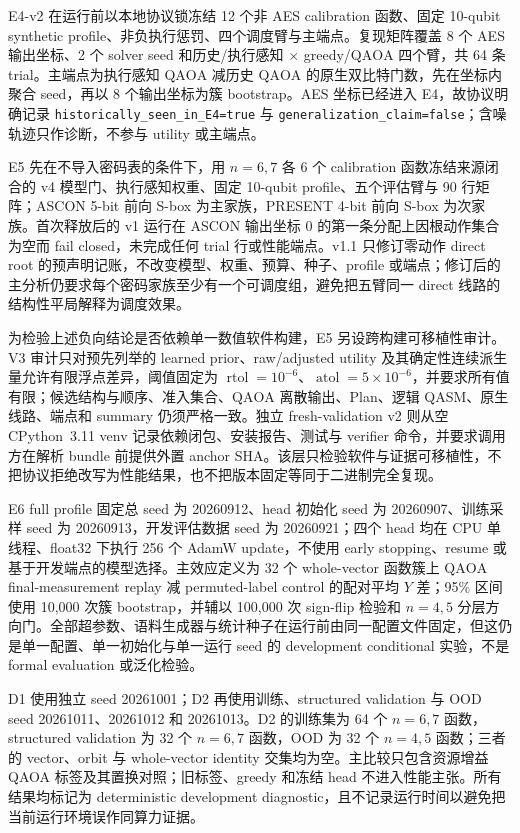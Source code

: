 \documentclass[UTF8,fontset=fandol,11pt]{ctexart}
\newcommand{\qaoa}{\ensuremath{\mathrm{QAOA}}}
\begin{document}
E4-v2 在运行前以本地协议锁冻结 12 个非 AES calibration 函数、固定 10-qubit synthetic profile、非负执行惩罚、四个调度臂与主端点。复现矩阵覆盖 8 个 AES 输出坐标、2 个 solver seed 和历史/执行感知 $\times$ greedy/\qaoa{} 四个臂，共 64 条 trial。主端点为执行感知 \qaoa{} 减历史 \qaoa{} 的原生双比特门数，先在坐标内聚合 seed，再以 8 个输出坐标为簇 bootstrap。AES 坐标已经进入 E4，故协议明确记录 \texttt{historically\_seen\_in\_E4=true} 与 \texttt{generalization\_claim=false}；含噪轨迹只作诊断，不参与 utility 或主端点。

E5 先在不导入密码表的条件下，用 $n=6,7$ 各 6 个 calibration 函数冻结来源闭合的 v4 模型门、执行感知权重、固定 10-qubit profile、五个评估臂与 90 行矩阵；ASCON 5-bit 前向 S-box 为主家族，PRESENT 4-bit 前向 S-box 为次家族\cite{nist2025ascon,bogdanov2007present}。首次释放后的 v1 运行在 ASCON 输出坐标 0 的第一条分配上因根动作集合为空而 fail closed，未完成任何 trial 行或性能端点。v1.1 只修订零动作 direct root 的预声明记账，不改变模型、权重、预算、种子、profile 或端点；修订后的主分析仍要求每个密码家族至少有一个可调度组，避免把五臂同一 direct 线路的结构性平局解释为调度效果。

为检验上述负向结论是否依赖单一数值软件构建，E5 另设跨构建可移植性审计。V3 审计只对预先列举的 learned prior、raw/adjusted utility 及其确定性连续派生量允许有限浮点差异，阈值固定为 $\operatorname{rtol}=10^{-6}$、$\operatorname{atol}=5\times10^{-6}$，并要求所有值有限；候选结构与顺序、准入集合、\qaoa{} 离散输出、Plan、逻辑 QASM、原生线路、端点和 summary 仍须严格一致。独立 fresh-validation v2 则从空 CPython~3.11 venv 记录依赖闭包、安装报告、测试与 verifier 命令，并要求调用方在解析 bundle 前提供外置 anchor SHA。该层只检验软件与证据可移植性，不把协议拒绝改写为性能结果，也不把版本固定等同于二进制完全复现。

E6 full profile 固定总 seed 为 20260912、head 初始化 seed 为 20260907、训练采样 seed 为 20260913，开发评估数据 seed 为 20260921；四个 head 均在 CPU 单线程、float32 下执行 256 个 AdamW update，不使用 early stopping、resume 或基于开发端点的模型选择。主效应定义为 32 个 whole-vector 函数簇上 \qaoa{} final-measurement replay 减 permuted-label control 的配对平均 $Y$ 差；95\% 区间使用 10,000 次簇 bootstrap，并辅以 100,000 次 sign-flip 检验和 $n=4,5$ 分层方向门。全部超参数、语料生成器与统计种子在运行前由同一配置文件固定，但这仍是单一配置、单一初始化与单一运行 seed 的 development conditional 实验，不是 formal evaluation 或泛化检验。

D1 使用独立 seed 20261001；D2 再使用训练、structured validation 与 OOD seed 20261011、20261012 和 20261013。D2 的训练集为 64 个 $n=6,7$ 函数，structured validation 为 32 个 $n=6,7$ 函数，OOD 为 32 个 $n=4,5$ 函数；三者的 vector、orbit 与 whole-vector identity 交集均为空。主比较只包含资源增益 QAOA 标签及其置换对照；旧标签、greedy 和冻结 head 不进入性能主张。所有结果均标记为 deterministic development diagnostic，且不记录运行时间以避免把当前运行环境误作同算力证据。
\end{document}
